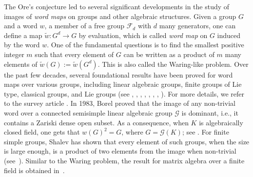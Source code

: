 \documentclass[10pt,twoside]{amsart}
\theoremstyle{definition}
\theoremstyle{definition}
\begin{document}
The Ore's conjecture led to several significant developments in the study of images of \emph{word maps} on groups and other algebraic structures. Given a group $G$ and a word $w$, a member of a free group $\mathcal F_d$ with $d$ many generators, one can define a map $\widetilde{w} \colon G^d\rightarrow G$ by evaluation, which is called \emph{word map} on $G$ induced by the word $w$. One of the fundamental questions is to find the smallest positive integer $m$ such that every element of $G$ can be written as a product of $m$ many elements of $\widetilde{w}(G):=\widetilde{w}(G^d)$. This is also called the Waring-like problem. Over the past few decades, several foundational results have been proved for word maps over various groups, including linear algebraic groups, finite groups of Lie type, classical groups, and Lie groups (see \cite{borelclassfnconjcomm}, \cite{exppowerchatterjee}, \cite{powermappralay}, 
\cite{thomgoto}, \cite{kundusinghpower}, \cite{larsenshalevdistribution}, \cite{wordimagelobotzky},
\cite{panjasinghorthosymp}). For more details, we refer to the survey article \cite{surveygkp}. In 1983, Borel proved that the image of any non-trivial word over a connected semisimple linear algebraic group $\mathcal{G}$ is dominant, i.e., it contains a Zariski dense open subset. As a consequence, when $K$ is algebraically closed field, one gets that $w(G)^2=G$, where $G=\mathcal{G}(K)$; see \cite{Borel1983}. For finite simple groups, Shalev has shown that every element of such groups, when the size is large enough, is a product of two elements from the image when non-trivial (see~\cite{shalevwaring}). Similar to the Waring problem, the result for matrix algebra over a finite field is obtained in~\cite{kishoreSingh}. 
\end{document}
